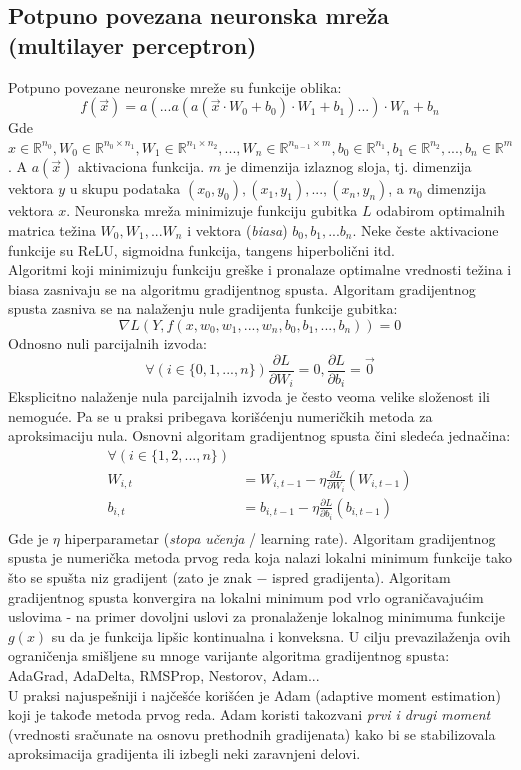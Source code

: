 \documentclass[a4paper,fleqn,12pt]{JMThesis}
\theoremstyle{plain}
\theoremstyle{definition}
\theoremstyle{definition}
\begin{document}
\subsection{Potpuno povezana neuronska mreža (multilayer perceptron)}
Potpuno povezane neuronske mreže su funkcije oblika:
\[
	f(\vec{x}) = a(...a(a(\vec{x} \cdot W_0 + b_0) \cdot W_1 + b_1)...)\cdot W_n + b_n
\]
Gde $x \in \mathbb{R}^{n_0}, W_0 \in \mathbb{R}^{n_0 \times n_1}, W_1 \in \mathbb{R}^{n_1 \times n_2},...,W_n \in \mathbb{R}^{n_{n-1} \times m},
b_0 \in \mathbb{R}^{n_1}, b_1 \in \mathbb{R}^{n_2}, ... , b_n \in \mathbb{R}^{m}$. A $a(\vec{x})$ aktivaciona funkcija.
$m$ je dimenzija izlaznog sloja, tj. dimenzija vektora $y$ u skupu podataka $(x_0,y_0), (x_1,y_1), ... , (x_n, y_n)$, a $n_0$ dimenzija vektora $x$.
Neuronska mreža minimizuje funkciju gubitka $L$ odabirom optimalnih matrica težina $W_0, W_1, ... W_n$ i vektora (\textit{biasa}) $b_0, b_1, ... b_n$.
Neke česte aktivacione funkcije su ReLU, sigmoidna funkcija, tangens hiperbolični itd.\\
Algoritmi koji minimizuju funkciju greške i pronalaze optimalne vrednosti težina i biasa zasnivaju se na algoritmu gradijentnog spusta.
Algoritam gradijentnog spusta zasniva se na nalaženju nule gradijenta funkcije gubitka:
\[ \nabla L(Y,f(x,w_0,w_1,...,w_n,b_0,b_1,...,b_n)) = 0 \]
Odnosno nuli parcijalnih izvoda:
\[ \forall(i \in \{0,1,...,n\}) \frac{\partial L}{\partial W_i} = 0, \frac{\partial L}{\partial b_i} = \vec{0} \]
Eksplicitno nalaženje nula parcijalnih izvoda je često veoma velike složenost ili nemoguće. Pa se u praksi pribegava korišćenju
numeričkih metoda za aproksimaciju nula. Osnovni algoritam gradijentnog spusta čini sledeća jednačina:
\[
	\begin{split}
		\forall (i \in \{1,2,...,n\})\\
		W_{i,t} &= W_{i,t-1} - \eta \frac{\partial L}{\partial W_i}(W_{i,t-1})\\
		b_{i,t} &= b_{i,t-1} - \eta \frac{\partial L}{\partial b_i}(b_{i,t-1})\\
	\end{split}
\]
Gde je $\eta$ hiperparametar (\textit{stopa učenja} / learning rate). Algoritam gradijentnog spusta je numerička metoda prvog reda
koja nalazi lokalni minimum funkcije tako što se spušta niz gradijent (zato je znak $-$ ispred gradijenta). Algoritam gradijentnog spusta
konvergira na lokalni minimum pod vrlo ograničavajućim uslovima - na primer dovoljni uslovi za pronalaženje lokalnog minimuma
funkcije $g(x)$ su da je funkcija lipšic kontinualna i konveksna. U cilju prevazilaženja ovih ograničenja smišljene su mnoge varijante
algoritma gradijentnog spusta: AdaGrad, AdaDelta, RMSProp, Nestorov, Adam...\\
U praksi najuspešniji i najčešće korišćen je Adam (adaptive moment estimation) koji je takođe metoda prvog reda. Adam koristi
takozvani \textit{prvi i drugi moment} (vrednosti sračunate na osnovu prethodnih gradijenata) kako bi se stabilizovala aproksimacija
gradijenta ili izbegli neki zaravnjeni delovi.
\end{document}
